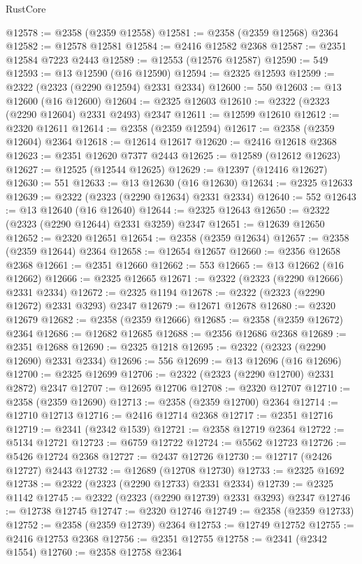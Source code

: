 \begin{lexlean}{RustCore}
\begin{coremodule}
@12578 := @2358 (@2359 @12558)
@12581 := @2358 (@2359 @12568) @2364
@12582 := @12578 @12581
@12584 := @2416 @12582 @2368
@12587 := @2351 @12584 @7223 @2443
@12589 := @12553 (@12576 @12587)
@12590 := 549
@12593 := @13 @12590 (@16 @12590)
@12594 := @2325 @12593
@12599 := @2322 (@2323 (@2290 @12594) @2331 @2334)
@12600 := 550
@12603 := @13 @12600 (@16 @12600)
@12604 := @2325 @12603
@12610 := @2322 (@2323 (@2290 @12604) @2331 @2493) @2347
@12611 := @12599 @12610
@12612 := @2320 @12611
@12614 := @2358 (@2359 @12594)
@12617 := @2358 (@2359 @12604) @2364
@12618 := @12614 @12617
@12620 := @2416 @12618 @2368
@12623 := @2351 @12620 @7377 @2443
@12625 := @12589 (@12612 @12623)
@12627 := @12525 (@12544 @12625)
@12629 := @12397 (@12416 @12627)
@12630 := 551
@12633 := @13 @12630 (@16 @12630)
@12634 := @2325 @12633
@12639 := @2322 (@2323 (@2290 @12634) @2331 @2334)
@12640 := 552
@12643 := @13 @12640 (@16 @12640)
@12644 := @2325 @12643
@12650 := @2322 (@2323 (@2290 @12644) @2331 @3259) @2347
@12651 := @12639 @12650
@12652 := @2320 @12651
@12654 := @2358 (@2359 @12634)
@12657 := @2358 (@2359 @12644) @2364
@12658 := @12654 @12657
@12660 := @2356 @12658 @2368
@12661 := @2351 @12660
@12662 := 553
@12665 := @13 @12662 (@16 @12662)
@12666 := @2325 @12665
@12671 := @2322 (@2323 (@2290 @12666) @2331 @2334)
@12672 := @2325 @1194
@12678 := @2322 (@2323 (@2290 @12672) @2331 @3293) @2347
@12679 := @12671 @12678
@12680 := @2320 @12679
@12682 := @2358 (@2359 @12666)
@12685 := @2358 (@2359 @12672) @2364
@12686 := @12682 @12685
@12688 := @2356 @12686 @2368
@12689 := @2351 @12688
@12690 := @2325 @1218
@12695 := @2322 (@2323 (@2290 @12690) @2331 @2334)
@12696 := 556
@12699 := @13 @12696 (@16 @12696)
@12700 := @2325 @12699
@12706 := @2322 (@2323 (@2290 @12700) @2331 @2872) @2347
@12707 := @12695 @12706
@12708 := @2320 @12707
@12710 := @2358 (@2359 @12690)
@12713 := @2358 (@2359 @12700) @2364
@12714 := @12710 @12713
@12716 := @2416 @12714 @2368
@12717 := @2351 @12716
@12719 := @2341 (@2342 @1539)
@12721 := @2358 @12719 @2364
@12722 := @5134 @12721
@12723 := @6759 @12722
@12724 := @5562 @12723
@12726 := @5426 @12724 @2368
@12727 := @2437 @12726
@12730 := @12717 (@2426 @12727) @2443
@12732 := @12689 (@12708 @12730)
@12733 := @2325 @1692
@12738 := @2322 (@2323 (@2290 @12733) @2331 @2334)
@12739 := @2325 @1142
@12745 := @2322 (@2323 (@2290 @12739) @2331 @3293) @2347
@12746 := @12738 @12745
@12747 := @2320 @12746
@12749 := @2358 (@2359 @12733)
@12752 := @2358 (@2359 @12739) @2364
@12753 := @12749 @12752
@12755 := @2416 @12753 @2368
@12756 := @2351 @12755
@12758 := @2341 (@2342 @1554)
@12760 := @2358 @12758 @2364

\end{coremodule}
\end{lexlean}
